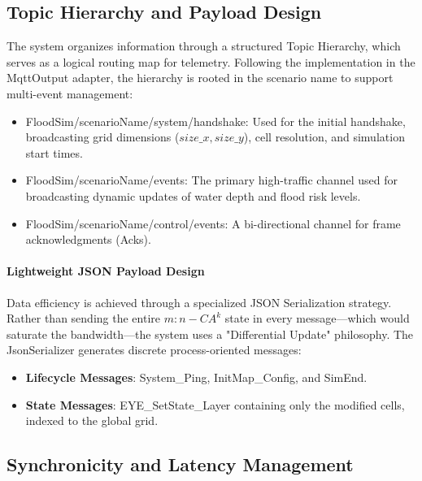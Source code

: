 \subsection{Topic Hierarchy and Payload Design}

The system organizes information through a structured Topic Hierarchy, which serves as a logical routing map for telemetry. Following 
the implementation in the MqttOutput adapter, the hierarchy is rooted in the scenario name to support multi-event management:

\begin{itemize}
    \item FloodSim/{scenarioName}/system/handshake: Used for the initial handshake, broadcasting grid dimensions ($size\_x, size\_y$), cell resolution, and simulation start times.

    \item FloodSim/{scenarioName}/events: The primary high-traffic channel used for broadcasting dynamic updates of water depth and flood risk levels.

    \item FloodSim/{scenarioName}/control/events: A bi-directional channel for frame acknowledgments (Acks).
\end{itemize}

\paragraph{Lightweight JSON Payload Design}

Data efficiency is achieved through a specialized JSON Serialization strategy. Rather than sending the entire $m:n-CA^k$ state in every 
message—which would saturate the bandwidth—the system uses a "Differential Update" philosophy. The JsonSerializer generates discrete 
process-oriented messages:

\begin{itemize}
    \item \textbf{Lifecycle Messages}: System\_Ping, InitMap\_Config, and SimEnd.

    \item \textbf{State Messages}: EYE\_SetState\_Layer containing only the modified cells, indexed to the global grid.
\end{itemize}


\subsection{Synchronicity and Latency Management}

